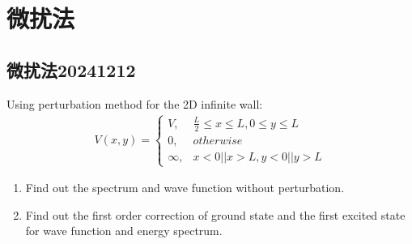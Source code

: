 \documentclass{article}
\begin{document}
\section{微扰法}
\subsection{微扰法20241212}
Using perturbation method for the 2D infinite wall:
\begin{align*}
    V(x,y)=
    \begin{cases}
        V,&\frac{L}{2}\leq x \leq L,0\leq y\leq L\\
        0,&otherwise\\
        \infty,&x<0||x>L,y<0||y>L
    \end{cases}
\end{align*}
\begin{enumerate}
    \item  Find out the spectrum and wave function without perturbation.
    \item Find out the first order correction of ground state and the first excited state for wave function and energy spectrum.
\end{enumerate}
\end{document}
